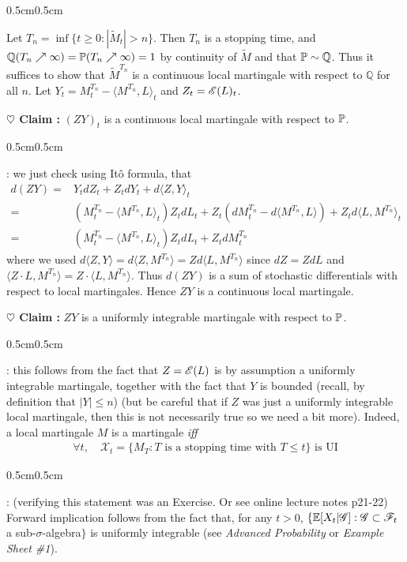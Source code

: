 \documentclass[12pt,a4paper]{article}
\newenvironment{proof}
{\begin{changemargin}{0.5cm}{0.5cm} 
	}%
	{\end{changemargin}
}
\newenvironment{subproof}
{\begin{changemargin}{0.5cm}{0.5cm} 
	}%
	{\end{changemargin}
}
\newenvironment{p}
{\begin{proof} 
	}%
	{\end{proof}
}
\begin{document}
\begin{p}
\pf Let $T_n = \inf \{t\geq 0 : |\tilde{M}_t| >n \}$. Then $T_n$ is a stopping time, and $\mathbb{Q}(T_n \nearrow \infty) = \mathbb{P} (T_n \nearrow \infty)=1$ by continuity of $\tilde{M}$ and that $\mathbb{P} \sim \mathbb{Q}$. Thus it suffices to show that $\tilde{M}^{T_n}$ is a continuous local martingale with respect to $\mathbb{Q}$ for all $n$. Let $Y_t = {M}_t^{T_n} - \langle M^{T_n} , L \rangle_t$ and $Z_t = \mathscr{E}(L)_t$.

\textbf{$\heartsuit$ Claim :} $(Z Y)_t$ is a continuous local martingale with respect to $\mathbb{P}$. 
\begin{subproof}
: we just check using It\^o formula, that
\begin{align*}
d(ZY) =& Y_t dZ_t + Z_t dY_t + d\langle Z, Y \rangle_t \\
=& (M_t^{T_n} - \langle M^{T_n}, L \rangle_t )Z_t dL_t + Z_t (dM_t^{T_n} - d\langle M^{T_n}, L \rangle) + Z_t d\langle L, M^{T_n} \rangle_t \\
= & (M_t^{T_n} - \langle M^{T_n}, L \rangle_t )Z_t dL_t + Z_t dM_t^{T_n}
\end{align*}
where we used $d \langle Z, Y \rangle = d\langle Z, M^{T_n} \rangle = Zd\langle L, M^{T_n} \rangle$ since $dZ= ZdL$ and $\langle Z\cdot L, M^{T_n} \rangle = Z\cdot \langle L, M^{T_n} \rangle$. Thus $d(ZY)$ is a sum of stochastic differentials with respect to local martingales. Hence $ZY$ is a continuous local martingale.
\end{subproof}

\textbf{$\heartsuit$ Claim :} $ZY$ is a uniformly integrable martingale with respect to $\mathbb{P}$.
\begin{subproof}
: this follows from the fact that $Z= \mathscr{E}(L)$ is by assumption a uniformly integrable martingale, together with the fact that $Y$ is bounded (recall, by definition that $|Y|\leq n$) (but be careful that if $Z$ was just a uniformly integrable local martingale, then this is not necessarily true so we need a bit more). Indeed, a local martingale $M$ is a martingale \emph{iff}
\begin{align*}
\forall t, \quad \mathscr{X}_t = \{ M_T : T\text{ is a stopping time with } T\leq t \} \text{ is UI}
\end{align*}
\begin{subproof}
: (verifying  this statement was an Exercise. Or see online lecture notes p21-22) Forward implication follows from the fact that, for any $t>0$, $\{ \mathbb{E}[X_t | \mathscr{G}] : \mathscr{G} \subset \mathscr{F}_t$ a sub-$\sigma$-algebra$\}$ is uniformly integrable (see \emph{Advanced Probability} or \emph{Example Sheet \#1}).


\end{subproof}
\end{subproof}
\end{p}
\end{document}
